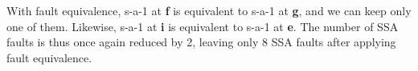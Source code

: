 With fault equivalence, s-a-1 at \textbf{f} is equivalent to s-a-1 at \textbf{g}, and we can keep only one of them. Likewise, s-a-1 at \textbf{i} is equivalent to s-a-1 at \textbf{e}. The number of SSA faults is thus once again reduced by 2, leaving only 8 SSA faults after applying fault equivalence.
